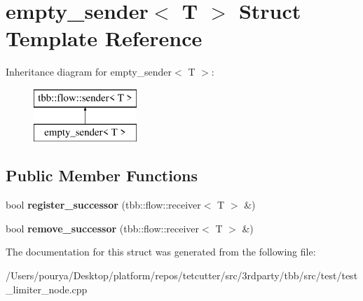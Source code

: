 \hypertarget{structempty__sender}{}\section{empty\+\_\+sender$<$ T $>$ Struct Template Reference}
\label{structempty__sender}
Inheritance diagram for empty\+\_\+sender$<$ T $>$\+:\begin{figure}[H]
\begin{center}
\leavevmode
\includegraphics[height=2.000000cm]{structempty__sender}
\end{center}
\end{figure}
\subsection*{Public Member Functions}
\begin{DoxyCompactItemize}
\item 
\hypertarget{structempty__sender_a9c96d342f94ad1ce9af1320ad8036788}{}bool {\bfseries register\+\_\+successor} (tbb\+::flow\+::receiver$<$ T $>$ \&)\label{structempty__sender_a9c96d342f94ad1ce9af1320ad8036788}

\item 
\hypertarget{structempty__sender_aec83bfc9292e7d700d999e0e918349c9}{}bool {\bfseries remove\+\_\+successor} (tbb\+::flow\+::receiver$<$ T $>$ \&)\label{structempty__sender_aec83bfc9292e7d700d999e0e918349c9}

\end{DoxyCompactItemize}


The documentation for this struct was generated from the following file\+:\begin{DoxyCompactItemize}
\item 
/\+Users/pourya/\+Desktop/platform/repos/tetcutter/src/3rdparty/tbb/src/test/test\+\_\+limiter\+\_\+node.\+cpp\end{DoxyCompactItemize}
